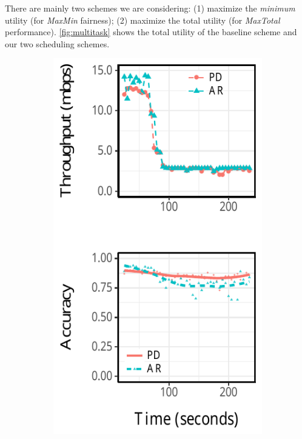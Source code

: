 There are mainly two schemes we are considering: (1) maximize the
\textit{minimum} utility (for \textit{MaxMin} fairness); (2) maximize the total
utility (for \textit{MaxTotal} performance). \autoref{fig:multitask} shows the
total utility of the baseline scheme and our two scheduling schemes.

\begin{figure}
  \centering
  \begin{subfigure}[t]{0.49\columnwidth}
    \centering
    \includegraphics[width=\textwidth]{figures/multitask-eq-bw.pdf}

\end{subfigure}
\end{figure}
